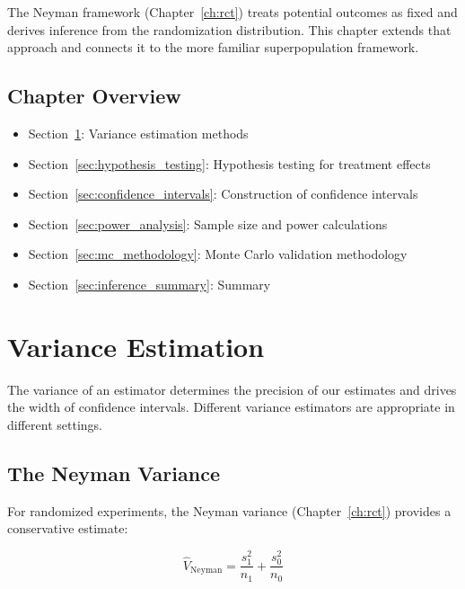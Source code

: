 The Neyman framework (Chapter~\ref{ch:rct}) treats potential outcomes as fixed and derives inference from the randomization distribution. This chapter extends that approach and connects it to the more familiar superpopulation framework.

\subsection{Chapter Overview}

\begin{itemize}
    \item Section~\ref{sec:var_estimation}: Variance estimation methods
    \item Section~\ref{sec:hypothesis_testing}: Hypothesis testing for treatment effects
    \item Section~\ref{sec:confidence_intervals}: Construction of confidence intervals
    \item Section~\ref{sec:power_analysis}: Sample size and power calculations
    \item Section~\ref{sec:mc_methodology}: Monte Carlo validation methodology
    \item Section~\ref{sec:inference_summary}: Summary
\end{itemize}


\section{Variance Estimation}
\label{sec:var_estimation}

The variance of an estimator determines the precision of our estimates and drives the width of confidence intervals. Different variance estimators are appropriate in different settings.

\subsection{The Neyman Variance}

For randomized experiments, the Neyman variance (Chapter~\ref{ch:rct}) provides a conservative estimate:

\begin{equation}
\hat{V}_{\text{Neyman}} = \frac{s_1^2}{n_1} + \frac{s_0^2}{n_0}
\label{eq:neyman_var_ch3}
\end{equation}

